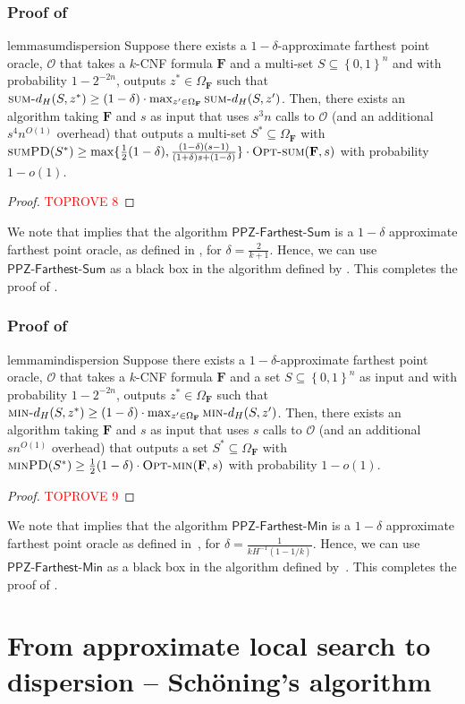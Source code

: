 \documentclass[11pt, letterpaper]{article}
\theoremstyle{definition}
\newcommand{\set}[1]{\left \{ #1 \right \}}
\newcommand{\f}{\mathbf{F}}
\newcommand{\Om}{\Omega_{\f}}
\newcommand{\PD}{\textsc{minPD}}
\newcommand{\SPD}{\textsc{sumPD}}
\newcommand{\sumd}{\textsc{sum-}d_H}
\newcommand{\mind}{\textsc{min-}d_H}
\newcommand{\opts}{\textsc{Opt-sum}}
\newcommand{\optm}{\textsc{Opt-min}}
\newcommand{\sch}{Sch\"{o}ning\xspace}
\begin{document}
 \subsubsection*{Proof of }
\begin{restatable}{lemma}{sumdispersion} \label{lem:sumdispersion}
    Suppose there exists a $1-\delta$-approximate farthest point oracle, $\mathcal{O}$ that takes a $k$-CNF formula $\f$ and a multi-set $S \subseteq \set{0,1}^n$ and with probability $1-2^{-2n}$, outputs $z^* \in \Om$ such that $\sumd(S, z^*) \geq (1-\delta) \cdot \max_{z' \in \Om} \sumd(S, z')$. Then, there exists an algorithm taking $\f$ and $s$ as input that uses $s^3 n$ calls to $\mathcal{O}$ (and an additional $s^4 n^{O(1)}$ overhead) that outputs a multi-set $S^* \subseteq \Om$ with $\SPD(S^*) \geq \max \{\frac{1}{2}(1-\delta) ,\frac{(1-\delta)(s-1)}{(1+\delta)s+(1-\delta)} \}\cdot \opts(\f,s)$ with probability $1-o(1)$.
\end{restatable}
\begin{proof}\textcolor{red}{TOPROVE 8}\end{proof}

We note that  implies that the algorithm $\textsf{PPZ-Farthest-Sum}$ is a $1-\delta$ approximate farthest point oracle, as defined in , for $\delta=\frac{2}{k+1}$. Hence, we can use $\textsf{PPZ-Farthest-Sum}$ as a black box in the algorithm defined by . This completes the proof of .
\subsubsection*{Proof of } 
\begin{restatable}{lemma}{mindispersion}
\label{lem:mindispersion}
    Suppose there exists a $1-\delta$-approximate farthest point oracle, $\mathcal{O}$ that takes a $k$-CNF formula $\f$ and a set $S \subseteq \set{0,1}^n$ as input and with probability $1-2^{-2n}$, outputs $z^* \in \Om$ such that $\mind(S, z^*) \geq (1-\delta) \cdot \max_{z' \in \Om} \mind(S, z')$. Then, there exists an algorithm taking $\f$ and $s$ as input that uses $s$ calls to $\mathcal{O}$ (and an additional $sn^{O(1)}$ overhead) that outputs a set $S^* \subseteq \Om$ with $\PD(S^*) \geq \frac{1}{2} (1-\delta)\cdot \optm(\f,s)$ with probability $1-o(1)$.
\end{restatable}
\begin{proof}\textcolor{red}{TOPROVE 9}\end{proof}
We note that  implies that the algorithm $\textsf{PPZ-Farthest-Min}$ is a $1-\delta$ approximate farthest point oracle as defined in~, for $\delta=\frac{1}{k H^{-1}(1-1/k)}$. Hence, we can use $\textsf{PPZ-Farthest-Min}$ as a black box in the algorithm defined by~. This completes the proof of .  \section{From approximate local search to dispersion -- \sch's algorithm}\label{sec:sch}
\end{document}
